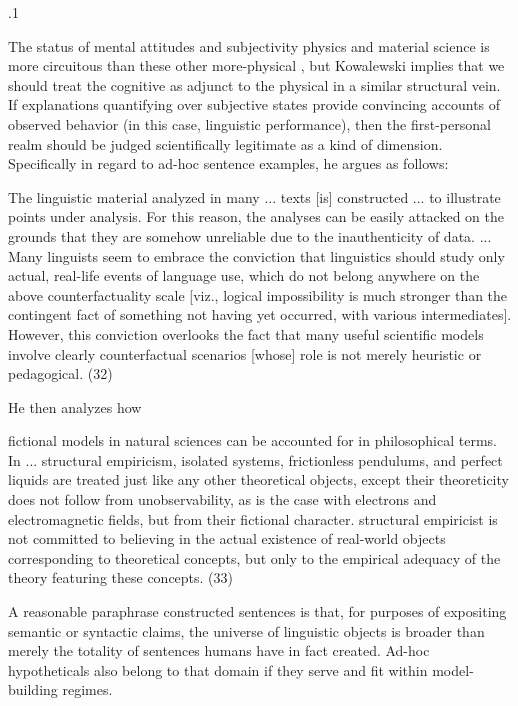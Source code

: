 \documentclass[11pt, twocolumn]{article}
\begin{document}
\p.1{%
\:\+The status of mental attitudes and subjectivity \visavis{} physics and material
science is more circuitous than these other more-physical ,
but Kowalewski implies that we should treat the cognitive as adjunct to the
physical in a similar structural vein. \> If explanations quantifying
over subjective states provide convincing accounts of observed
behavior (in this case, linguistic performance), then the first-personal
realm should be judged scientifically legitimate as a kind of 
dimension. \> Specifically in regard to ad-hoc sentence
examples, he argues as follows:\< \upAdj{7pt}

\begin{blockQuote}
\+The linguistic material analyzed in many ... texts [is] constructed
... to illustrate points under analysis. \> 
For this reason, the analyses can be easily attacked on the grounds that
they are somehow unreliable due to the inauthenticity of 
data. ... \> Many linguists seem to embrace 
the conviction that linguistics should
study only actual, real-life events of language use, which do not belong anywhere on the above
counterfactuality scale [viz., logical impossibility is much stronger
than the contingent fact of something not having yet occurred, with
various intermediates]. \> However, this conviction overlooks the fact
that many useful scientific models involve clearly counterfactual scenarios
[whose] role is not merely 
heuristic or pedagogical.\< (32)
\end{blockQuote}

\nip{}%
\+He then analyzes how\< \upAdj{9pt}

\begin{blockQuote}
\+fictional models in natural sciences can be accounted for in
philosophical terms. \> In \hspace{-1pt} ... structural empiricism, isolated
systems, frictionless pendulums, and perfect liquids are treated just like
any other theoretical objects, except their theoreticity does not follow from
unobservability, as is the case with electrons and electromagnetic fields, but
from their fictional character. \> [A] structural empiricist is not
committed to believing in the actual existence of real-world objects corresponding
to theoretical concepts, but only to the empirical adequacy of the theory
featuring these concepts.\<  (33)
\end{blockQuote}

\nip{}%
\+A reasonable paraphrase \visavis{} constructed sentences is that, for purposes
of expositing semantic or syntactic claims, the universe of linguistic
objects is broader than merely the totality of sentences humans have in
fact created. \> Ad-hoc hypotheticals also belong to that
domain if they serve and fit within model-building regimes.\<\;
} %
\end{document}
